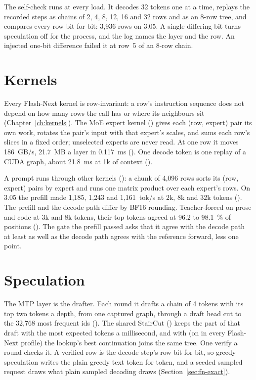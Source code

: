 The self-check runs at every load. It decodes 32 tokens one at a time, replays the recorded steps as chains of 2, 4, 8, 12, 16 and 32 rows and as an 8-row tree, and compares every row bit for bit: 3,936 rows on 3.05. A single differing bit turns speculation off for the process, and the log names the layer and the row. An injected one-bit difference failed it at row~5 of an 8-row chain.

\section{Kernels}

Every Flash-Next kernel is row-invariant: a row's instruction sequence does not depend on how many rows the call has or where its neighbours sit (Chapter~\ref{ch:kernels}). The MoE expert kernel () gives each (row, expert) pair its own work, rotates the pair's input with that expert's scales, and sums each row's slices in a fixed order; unselected experts are never read. At one row it moves 186~GB/s, 21.7~MB a layer in 0.117~ms (\measured). One decode token is one replay of a CUDA graph, about 21.8~ms at 1k of context (\measured).

A prompt runs through other kernels (): a chunk of 4,096 rows sorts its (row, expert) pairs by expert and runs one matrix product over each expert's rows. On 3.05 the prefill made 1,185, 1,243 and 1,161~tok/s at 2k, 8k and 32k tokens (\measured). The prefill and the decode path differ by BF16 rounding. Teacher-forced on prose and code at 3k and 8k tokens, their top tokens agreed at 96.2 to 98.1~\% of positions (\measured). The gate the prefill passed asks that it agree with the decode path at least as well as the decode path agrees with the reference forward, less one point.

\section{Speculation}\label{sec:fn-spec}

The MTP layer is the drafter. Each round it drafts a chain of 4 tokens with its top two tokens a depth, from one captured graph, through a draft head cut to the 32,768 most frequent ids (). The shared StairCut () keeps the part of that draft with the most expected tokens a millisecond, and with  (on in every Flash-Next profile) the lookup's best continuation joins the same tree. One verify a round checks it. A verified row is the decode step's row bit for bit, so greedy speculation writes the plain greedy text token for token, and a seeded sampled request draws what plain sampled decoding draws (Section~\ref{sec:fn-exact}).

